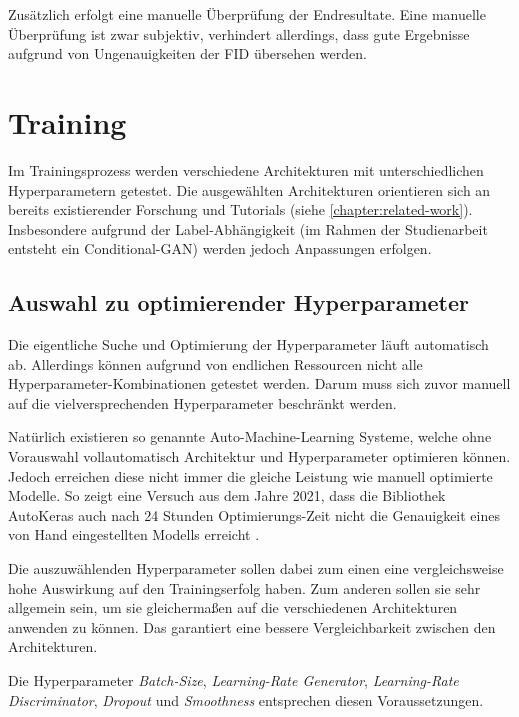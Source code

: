 Zusätzlich erfolgt eine manuelle Überprüfung der Endresultate.
Eine manuelle Überprüfung ist zwar subjektiv, verhindert allerdings, dass gute Ergebnisse aufgrund von Ungenauigkeiten der \acrshort{FID} übersehen werden.

\section{Training}
Im Trainingsprozess werden verschiedene Architekturen mit unterschiedlichen Hyperparametern getestet.
Die ausgewählten Architekturen orientieren sich an bereits existierender Forschung und Tutorials (siehe \cref{chapter:related-work}).
Insbesondere aufgrund der Label-Abhängigkeit (im Rahmen der Studienarbeit entsteht ein Conditional-GAN) werden jedoch Anpassungen erfolgen.


\subsection{Auswahl zu optimierender Hyperparameter}
Die eigentliche Suche und Optimierung der Hyperparameter läuft automatisch ab.
Allerdings können aufgrund von endlichen Ressourcen nicht alle Hyperparameter-Kombinationen getestet werden.
Darum muss sich zuvor manuell auf die vielversprechenden Hyperparameter beschränkt werden.
\newline

Natürlich existieren so genannte Auto-Machine-Learning Systeme, welche ohne Vorauswahl vollautomatisch Architektur und Hyperparameter optimieren können. 
Jedoch erreichen diese nicht immer die gleiche Leistung wie manuell optimierte Modelle.
So zeigt eine Versuch aus dem Jahre 2021, dass die Bibliothek AutoKeras \cite{auto-keras} auch nach 24 Stunden Optimierungs-Zeit nicht die Genauigkeit eines von Hand eingestellten Modells erreicht \cite[S. 2036]{dl-framework-evaluation}.
\newline

Die auszuwählenden Hyperparameter sollen dabei zum einen eine vergleichsweise hohe Auswirkung auf den Trainingserfolg haben.
Zum anderen sollen sie sehr allgemein sein, um sie gleichermaßen auf die verschiedenen Architekturen anwenden zu können.
Das garantiert eine bessere Vergleichbarkeit zwischen den Architekturen.
\newline

Die Hyperparameter \textit{Batch-Size}, \textit{Learning-Rate Generator}, \textit{Learning-Rate Discriminator}, \textit{Dropout} und \textit{Smoothness} entsprechen diesen Voraussetzungen.

